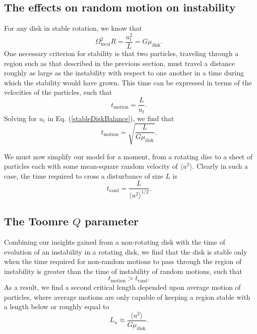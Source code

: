 \documentclass[aps,pra,twocolumn]{revtex4-1}
\begin{document}
\subsection{\label{section 3.2} The effects on random motion on instability}
For any disk in stable rotation, we know that
\begin{equation}
\Omega_\text{local}^2 R = \frac{u_t^2}{L} = G \mu_\text{disk}. \label{stableDiskBalance}
\end{equation}
One necessary criterion for stability is that two particles, traveling through a region such as that described in the previous section, must travel a distance roughly as large as the instability with respect to one another in a time during which the stability would have grown.  This time can be expressed in terms of the velocities of the particles, such that 
\begin{equation}
t_\text{motion} = \frac{L}{u_t}.
\end{equation}
Solving for $u_t$ in Eq. (\ref{stableDiskBalance}), we find that
\begin{equation}
t_\text{motion} = \sqrt{\frac{L}{G\mu_\text{disk}}}.
\end{equation}

We must now simplify our model for a moment, from a rotating disc to a sheet of particles each with some mean-square random velocity of $\langle u^2 \rangle$. Clearly in such a case, the time required to cross a disturbance of size $L$ is
\begin{equation}
t_\text{rand} = \frac{L}{\langle u^2 \rangle^{1/2}}.
\end{equation}

\subsection{\label{section 3.3} The Toomre $Q$ parameter}
Combining our insights gained from a non-rotating disk with the time of evolution of an instability in a rotating disk, we find that the disk is stable only when the time required for non-random motions to pass through the region of instability is greater than the time of instability of random motions, such that
\begin{equation}
t_\text{motion} > t_\text{rand}.
\end{equation}
As a result, we find a second critical length depended upon average motion of particles, where average motions are only capable of keeping a region stable with a length below or roughly equal to
\begin{equation}
L_u \approx \frac{\langle u^2 \rangle}{G\mu_\text{disk}}. \label{crit2.1}
\end{equation}
\end{document}
